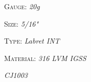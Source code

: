 \documentclass[8pt]{article}
\date{\today}
\title{}
\begin{document}
{\textsc{Gauge}}:      {\scriptsize\textit{20g}}

{\textsc{Size}}:      {\scriptsize\textit{5/16"}}

{\textsc{Type}}:      {\scriptsize\textit{Labret INT}}

{\textsc{Material}}:      {\scriptsize\textit{316 LVM IGSS}}

{\scriptsize\textit{CJ1003}}
\end{document}
